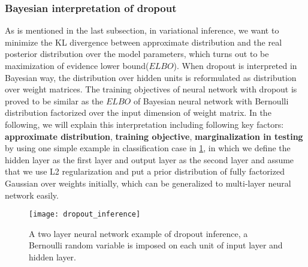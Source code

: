 \subsubsection{Bayesian interpretation of dropout}
As is mentioned in the last subsection, in variational inference, we want to minimize the KL divergence between approximate distribution and the real posterior distribution over the model parameters, which turns out to be maximization of evidence lower bound($ELBO$). When dropout is interpreted in Bayesian way, the distribution over hidden units is reformulated as distribution over weight matrices. The training objectives of neural network with dropout is proved to be similar as the $ELBO$ of Bayesian neural network with Bernoulli distribution factorized over the input dimension of weight matrix. In the following, we will explain this interpretation including following key factors: \textbf{approximate distribution}, \textbf{training objective}, \textbf{marginalization in testing} by using one simple example in {classification} case in \ref{fig:dropout_inference}, in which we define the hidden layer as the first layer and output layer as the second layer and assume that we use L2 regularization and put a prior distribution of fully factorized Gaussian over weights initially, which can be generalized to multi-layer neural network easily.


\begin{figure}[h!]
		\centering
		\texttt{[image: dropout\_inference]}
		\caption{A two layer neural network example of dropout inference, a Bernoulli random variable is imposed on each unit of input layer and hidden layer.}		
		\label{fig:dropout_inference}
\end{figure}

\newpage
